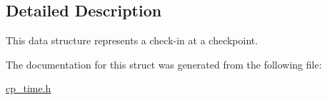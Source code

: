 \subsection{Detailed Description}
This data structure represents a check-\/in at a checkpoint. 

The documentation for this struct was generated from the following file\-:\begin{DoxyCompactItemize}
\item 
\hyperlink{cp__time_8h}{cp\-\_\-time.\-h}\end{DoxyCompactItemize}
